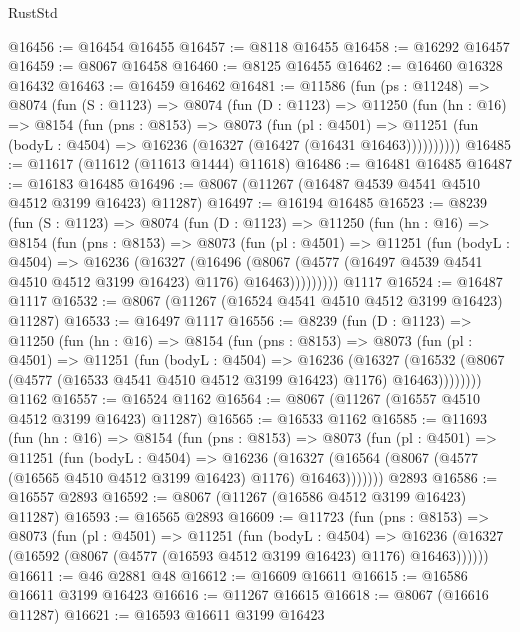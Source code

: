 \begin{lexlean}{RustStd}
\begin{coremodule}
@16456 := @16454 @16455
@16457 := @8118 @16455
@16458 := @16292 @16457
@16459 := @8067 @16458
@16460 := @8125 @16455
@16462 := @16460 @16328 @16432
@16463 := @16459 @16462
@16481 := @11586
    (fun (ps : @11248) =>
    @8074
      (fun (S : @1123) =>
      @8074
        (fun (D : @1123) =>
        @11250
          (fun (hn : @16) =>
          @8154
            (fun (pns : @8153) =>
            @8073
              (fun (pl : @4501) =>
              @11251 (fun (bodyL : @4504) => @16236 (@16327 (@16427 (@16431 @16463))))))))))
@16485 := @11617 (@11612 (@11613 @1444) @11618)
@16486 := @16481 @16485
@16487 := @16183 @16485
@16496 := @8067 (@11267 (@16487 @4539 @4541 @4510 @4512 @3199 @16423) @11287)
@16497 := @16194 @16485
@16523 := @8239
    (fun (S : @1123) =>
    @8074
      (fun (D : @1123) =>
      @11250
        (fun (hn : @16) =>
        @8154
          (fun (pns : @8153) =>
          @8073
            (fun (pl : @4501) =>
            @11251
              (fun (bodyL : @4504) =>
              @16236
                (@16327
                  (@16496
                    (@8067
                      (@4577 (@16497 @4539 @4541 @4510 @4512 @3199 @16423) @1176)
                      @16463)))))))))
    @1117
@16524 := @16487 @1117
@16532 := @8067 (@11267 (@16524 @4541 @4510 @4512 @3199 @16423) @11287)
@16533 := @16497 @1117
@16556 := @8239
    (fun (D : @1123) =>
    @11250
      (fun (hn : @16) =>
      @8154
        (fun (pns : @8153) =>
        @8073
          (fun (pl : @4501) =>
          @11251
            (fun (bodyL : @4504) =>
            @16236
              (@16327
                (@16532 (@8067 (@4577 (@16533 @4541 @4510 @4512 @3199 @16423) @1176) @16463))))))))
    @1162
@16557 := @16524 @1162
@16564 := @8067 (@11267 (@16557 @4510 @4512 @3199 @16423) @11287)
@16565 := @16533 @1162
@16585 := @11693
    (fun (hn : @16) =>
    @8154
      (fun (pns : @8153) =>
      @8073
        (fun (pl : @4501) =>
        @11251
          (fun (bodyL : @4504) =>
          @16236
            (@16327 (@16564 (@8067 (@4577 (@16565 @4510 @4512 @3199 @16423) @1176) @16463)))))))
    @2893
@16586 := @16557 @2893
@16592 := @8067 (@11267 (@16586 @4512 @3199 @16423) @11287)
@16593 := @16565 @2893
@16609 := @11723
    (fun (pns : @8153) =>
    @8073
      (fun (pl : @4501) =>
      @11251
        (fun (bodyL : @4504) =>
        @16236 (@16327 (@16592 (@8067 (@4577 (@16593 @4512 @3199 @16423) @1176) @16463))))))
@16611 := @46 @2881 @48
@16612 := @16609 @16611
@16615 := @16586 @16611 @3199 @16423
@16616 := @11267 @16615
@16618 := @8067 (@16616 @11287)
@16621 := @16593 @16611 @3199 @16423

\end{coremodule}
\end{lexlean}

